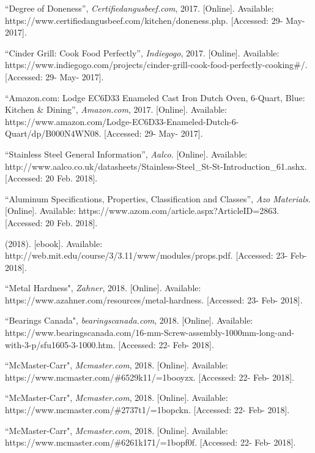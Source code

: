 \documentclass[11pt]{article}
\begin{document}
\newpage
\begin{thebibliography}{0}

``Degree of Doneness'', \textit{Certifiedangusbeef.com}, 2017. [Online]. Available: https://www.certifiedangusbeef.com/kitchen/doneness.php. [Accessed: 29- May- 2017].

``Cinder Grill: Cook Food Perfectly'', \textit{Indiegogo}, 2017. [Online]. Available: https://www.indiegogo.com/projects/cinder-grill-cook-food-perfectly-cooking\#/. [Accessed: 29- May- 2017].

``Amazon.com: Lodge EC6D33 Enameled Cast Iron Dutch Oven, 6-Quart, Blue: Kitchen \& Dining'', \textit{Amazon.com}, 2017. [Online]. Available: https://www.amazon.com/Lodge-EC6D33-Enameled-Dutch-6-Quart/dp/B000N4WN08. [Accessed: 29- May- 2017].

``Stainless Steel General Information”, \textit{Aalco}. [Online]. Available: http://www.aalco.co.uk/datasheets/Stainless-Steel\_St-St-Introduction\_61.ashx. [Accessed: 20 Feb. 2018].

``Aluminum Specifications, Properties, Classification and Classes”, \textit{Azo Materials}. [Online]. Available: https://www.azom.com/article.aspx?ArticleID=2863. [Accessed: 20 Feb. 2018].

(2018). [ebook]. Available: http://web.mit.edu/course/3/3.11/www/modules/props.pdf. [Accessed: 23- Feb- 2018].

``Metal Hardness", \textit{Zahner}, 2018. [Online]. Available: https://www.azahner.com/resources/metal-hardness. [Accessed: 23- Feb- 2018].

``Bearings Canada", \textit{bearingscanada.com}, 2018. [Online]. Available: https://www.bearingscanada.com/16-mm-Screw-assembly-1000mm-long-and-with-3-p/sfu1605-3-1000.htm. [Accessed: 22- Feb- 2018].

``McMaster-Carr", \textit{Mcmaster.com}, 2018. [Online]. Available: https://www.mcmaster.com/\#6529k11/=1booyzx. [Accessed: 22- Feb- 2018].

``McMaster-Carr", \textit{Mcmaster.com}, 2018. [Online]. Available: https://www.mcmaster.com/\#2737t1/=1bopckn. [Accessed: 22- Feb- 2018].

``McMaster-Carr", \textit{Mcmaster.com}, 2018. [Online]. Available: https://www.mcmaster.com/\#6261k171/=1bopf0f. [Accessed: 22- Feb- 2018].


\end{thebibliography}
\end{document}
